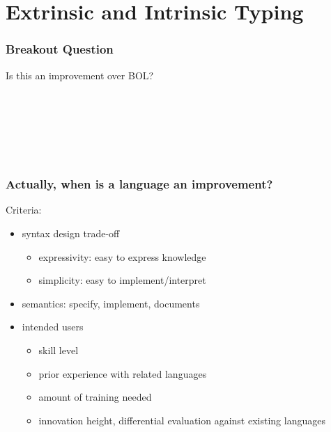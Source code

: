 \section{Extrinsic and Intrinsic Typing}

\begin{frame}\frametitle{Breakout Question}
Is this an improvement over BOL?
\begin{commgrammar}
\\
\\
\\
\\
\\
\end{commgrammar}
\end{frame}

\begin{frame}\frametitle{Actually, when is a language an improvement?}
Criteria:
\begin{itemize}
\item syntax design trade-off
 \begin{itemize}
  \item expressivity: easy to express knowledge
  \item simplicity: easy to implement/interpret
 \end{itemize}
\item semantics: specify, implement, documents
\item intended users
 \begin{itemize}
  \item skill level
  \item prior experience with related languages
  \item amount of training needed
  \item innovation height, differential evaluation against existing languages
 \end{itemize}
\end{itemize}
\end{frame}

